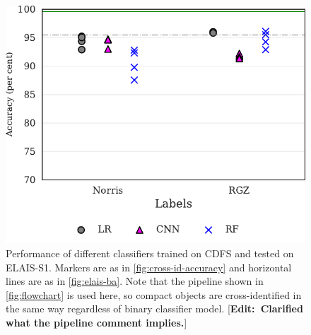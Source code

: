 \documentclass[fleqn,usenatbib,usedcolumn]{mnras}
\newcommand{\edit}[1]{ {\color{red}[{\bf Edit:~{#1}}]} }
\begin{document}
  \begin{figure}
    \centering
    \includegraphics[width=0.9\columnwidth]{images/elais_cross_identification_grid.pdf}
    \caption{Performance of different classifiers trained on CDFS and tested on ELAIS-S1. Markers are as in \autoref{fig:cross-id-accuracy} and horizontal lines are as in \autoref{fig:elais-ba}. Note that the pipeline shown in \autoref{fig:flowchart} is used here, so compact objects are cross-identified in the same way regardless of binary classifier model. \edit{Clarified what the pipeline comment implies.}
      \label{fig:elais-cross-id-accuracy}}
  \end{figure}
\end{document}
